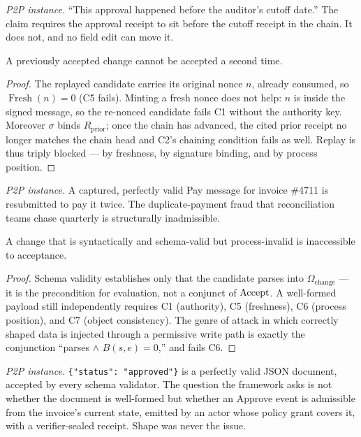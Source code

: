 \emph{P2P instance.} ``This approval happened before the auditor's cutoff
date.'' The claim requires the approval receipt to sit before the cutoff
receipt in the chain. It does not, and no field edit can move it.

\begin{proposition}[Replay]
\label{prop:replay}
A previously accepted change cannot be accepted a second time.
\end{proposition}
\begin{proof}
The replayed candidate carries its original nonce $n$, already consumed, so
$\operatorname{Fresh}(n) = 0$ (C5 fails). Minting a fresh nonce does not help:
$n$ is inside the signed message, so the re-nonced candidate fails C1 without
the authority key. Moreover $\sigma$ binds $R_{\mathrm{prior}}$; once the chain
has advanced, the cited prior receipt no longer matches the chain head and C2's
chaining condition fails as well. Replay is thus triply blocked --- by
freshness, by signature binding, and by process position.
\end{proof}

\emph{P2P instance.} A captured, perfectly valid \textsf{Pay} message for
invoice \#4711 is resubmitted to pay it twice. The duplicate-payment fraud
that reconciliation teams chase quarterly is structurally inadmissible.

\begin{proposition}
\label{prop:schema}
A change that is syntactically and schema-valid but process-invalid is
inaccessible to acceptance.
\end{proposition}
\begin{proof}
Schema validity establishes only that the candidate parses into
$\Omega_{\mathrm{change}}$ --- it is the precondition for evaluation, not a
conjunct of $\operatorname{Accept}$. A well-formed payload still independently requires C1
(authority), C5 (freshness), C6 (process position), and C7 (object
consistency). The genre of attack in which correctly shaped data is injected
through a permissive write path is exactly the conjunction
``parses $\wedge$ $B(s,e)=0$,'' and fails C6.
\end{proof}

\emph{P2P instance.} \texttt{\{"status": "approved"\}} is a perfectly valid
JSON document, accepted by every schema validator. The question the framework
asks is not whether the document is well-formed but whether an
\textsf{Approve} event is admissible from the invoice's current state, emitted
by an actor whose policy grant covers it, with a verifier-sealed receipt. Shape
was never the issue.

